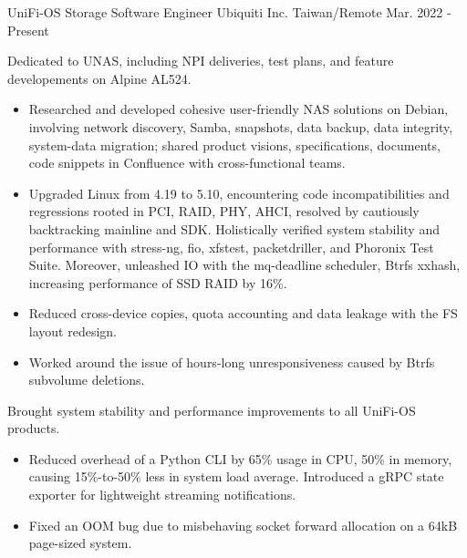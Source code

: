 

\begin{cventries}

  \cventry
    {UniFi-OS Storage Software Engineer} %
    {Ubiquiti Inc.} %
    {Taiwan/Remote} %
    {Mar. 2022 - Present} %
    {
      \begin{cvitems} %
        \item Dedicated to UNAS, including NPI deliveries, test plans, and
          feature developements on Alpine AL524.
        \begin{itemize}
          \item Researched and developed cohesive user-friendly NAS solutions
            on Debian, involving network discovery, Samba, snapshots, data
            backup, data integrity, system-data migration; shared product
            visions, specifications, documents, code snippets in Confluence with
            cross-functional teams.
          \item Upgraded Linux from 4.19 to 5.10, encountering code
            incompatibilities and regressions rooted in PCI, RAID, PHY, AHCI,
            resolved by cautiously backtracking mainline and SDK. Holistically
            verified system stability and performance with stress-ng, fio,
            xfstest, packetdriller, and Phoronix Test Suite. Moreover,
            unleashed IO with the mq-deadline scheduler, Btrfs xxhash,
            increasing performance of SSD RAID by 16\%.
          \item Reduced cross-device copies, quota accounting and data leakage
            with the FS layout redesign.
          \item Worked around the issue of hours-long unresponsiveness caused
            by Btrfs subvolume deletions.
        \end{itemize}
        \item Brought system stability and performance improvements to all
          UniFi-OS products.
        \begin{itemize}
          \item Reduced overhead of a Python CLI by 65\% usage in CPU, 50\% in
            memory, causing 15\%-to-50\% less in system load average.
            Introduced a gRPC state exporter for lightweight streaming
            notifications.
          \item Fixed an OOM bug due to misbehaving socket forward allocation on
            a 64kB page-sized system.
        \end{itemize}
      \end{cvitems}
    }


\end{cventries}
